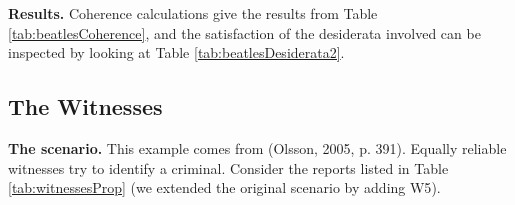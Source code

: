 \documentclass[
  10pt,
]{scrartcl}
\newcommand{\s}[1]{\textsf{#1}}
\begin{document}
\textbf{Results.} Coherence calculations give the results from Table \ref{tab:beatlesCoherence}, and the satisfaction of the desiderata involved can be inspected by looking at Table \ref{tab:beatlesDesiderata2}.

\begin{table}[H]

\caption{\label{tab:beatlesCoherence}Coherence scores in the Beatles scenario (rounded).}
\centering
{}
\end{table}

\begin{table}[H]

\caption{\label{tab:beatlesDesiderata2}Desiderata satisfaction in the Beatles scenario.}
\centering
{}
\end{table}

\hypertarget{the-witnesses}{%
\subsection{The Witnesses}\label{the-witnesses}}

\textbf{The scenario.} This example comes from (Olsson, 2005, p. 391). Equally reliable witnesses try to identify a criminal. Consider the reports listed in Table \ref{tab:witnessesProp} (we extended the original scenario by adding \s{W5}).
\end{document}

